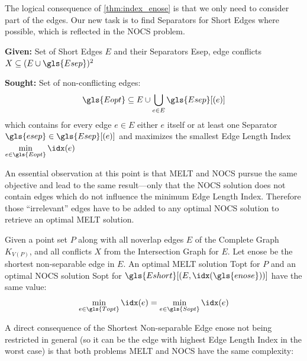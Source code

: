The logical consequence of \cref{thm:index_enose} is that we only need
to consider part of the edges. Our new task is to find Separators for
Short Edges where possible, which is reflected in the \gls{NOCS}
problem.

\begin{problem}
  \hfill
  \begin{labeling}{\hspace{4em}}
    \item[\textbf{Given:}]
      Set of Short Edges \(E\) and their Separators \gls{Esep},
      edge conflicts \(X \subseteq (E \cup \gls{Esep})^2\)
    \item[\textbf{Sought:}]
      Set of non-conflicting edges:
      \[
        \gls{Eopt} \subseteq E
        \cup \bigcup\limits_{e \in E} \gls{Esep}[(e)]
      \]
      which contains for every edge \(e \in E\) either \(e\) itself
      or at least one Separator \(\gls{esep} \in \gls{Esep}[(e)]\)
      and maximizes the smallest Edge Length Index
      \(\min\limits_{e \in \gls{Eopt}} \idx(e)\)
  \end{labeling}
\end{problem}

An essential observation at this point is that \gls{MELT} and
\gls{NOCS} pursue the same objective and lead to the same result---only
that the \gls{NOCS} solution does not contain edges which do not
influence the minimum Edge Length Index. Therefore those
``irrelevant'' edges have to be added to any optimal \gls{NOCS}
solution to retrieve an optimal \gls{MELT} solution.

\begin{theorem}
  \label{thm:equality_melt_nocs}
  Given a point set \(P\) along with all \gls{noverlap} edges \(E\)
  of the Complete Graph \(K_{V(P)}\), and all conflicts \(X\) from the
  Intersection Graph for \(E\). 
  Let \gls{enose} be the shortest non-separable edge in \(E\).
  An optimal \gls{MELT} solution \gls{Topt} for \(P\)
  and an optimal \gls{NOCS} solution \gls{Sopt} for
  \(\gls{Eshort}[(E,\idx(\gls{enose}))]\) have the same value:
  \[
    \min\limits_{e \in \gls{Topt}} \idx(e)
    = \min\limits_{e \in \gls{Sopt}} \idx(e)
  \]
\end{theorem}

A direct consequence of the Shortest Non-separable Edge \gls{enose}
not being restricted in general (so it can  be the edge with highest
Edge Length Index in the worst case) is that both problems \gls{MELT}
and \gls{NOCS} have the same complexity:

